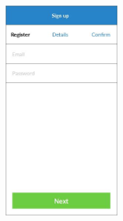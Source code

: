 \begin{figure}
\begin{minipage}{4.6cm}
    \includegraphics[width=4.2cm]{inc/ui_step2.jpg}
    \caption{}
    \label{fig:ui_step4b}
  \end{minipage}
\end{figure}